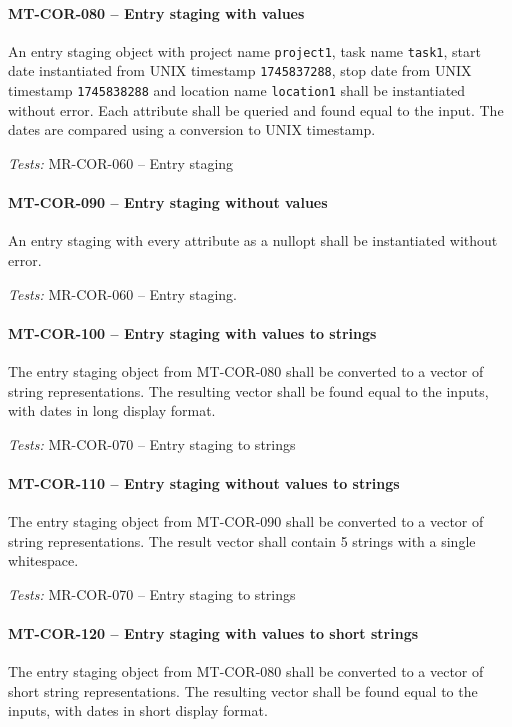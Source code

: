\paragraph{MT-COR-080 -- Entry staging with values}
An entry staging object with project name \lstinline{project1},
task name \lstinline{task1}, start date instantiated from UNIX timestamp
\lstinline{1745837288}, stop date from UNIX timestamp
\lstinline{1745838288} and location name \lstinline{location1}
shall be instantiated without error.
Each attribute shall be queried and found equal to the input.
The dates are compared using a conversion to UNIX timestamp.

\textit{Tests: } MR-COR-060 -- Entry staging

\paragraph{MT-COR-090 -- Entry staging without values}
An entry staging with every attribute as a nullopt shall be instantiated
without error.

\textit{Tests: } MR-COR-060 -- Entry staging.

\paragraph{MT-COR-100 -- Entry staging with values to strings}
The entry staging object from MT-COR-080 shall be converted to
a vector of string representations. The resulting vector shall be
found equal to the inputs, with dates in long display format.

\textit{Tests: } MR-COR-070 -- Entry staging to strings

\paragraph{MT-COR-110 -- Entry staging without values to strings}
The entry staging object from MT-COR-090 shall be converted to
a vector of string representations. The result vector shall
contain 5 strings with a single whitespace.

\textit{Tests: } MR-COR-070 -- Entry staging to strings

\paragraph{MT-COR-120 -- Entry staging with values to short strings}
The entry staging object from MT-COR-080 shall be converted to
a vector of short string representations. The resulting vector shall be
found equal to the inputs, with dates in short display format.

